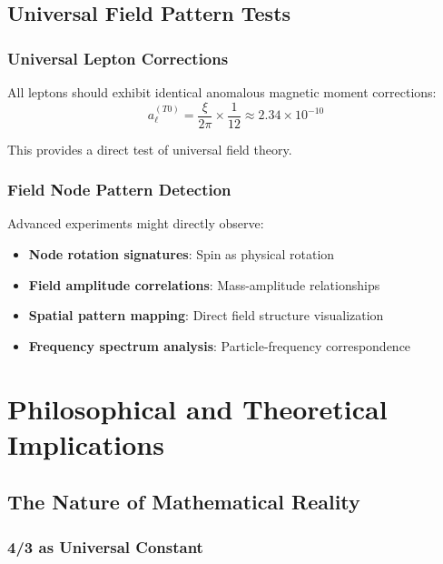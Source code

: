 	\subsection{Universal Field Pattern Tests}
	\label{subsec:field_pattern_tests}
	
	\subsubsection{Universal Lepton Corrections}
	\label{subsubsec:universal_lepton_corrections}
	
	All leptons should exhibit identical anomalous magnetic moment corrections:
	\begin{equation}
		a_{\ell}^{(T0)} = \frac{\xi}{2\pi} \times \frac{1}{12} \approx 2.34 \times 10^{-10}
		\label{eq:universal_lepton_prediction}
	\end{equation}
	
	This provides a direct test of universal field theory.
	
	\subsubsection{Field Node Pattern Detection}
	\label{subsubsec:node_pattern_detection}
	
	Advanced experiments might directly observe:
	\begin{itemize}
		\item \textbf{Node rotation signatures}: Spin as physical rotation
		\item \textbf{Field amplitude correlations}: Mass-amplitude relationships
		\item \textbf{Spatial pattern mapping}: Direct field structure visualization
		\item \textbf{Frequency spectrum analysis}: Particle-frequency correspondence
	\end{itemize}
	
	\section{Philosophical and Theoretical Implications}
	\label{sec:philosophical_implications}
	
	\subsection{The Nature of Mathematical Reality}
	\label{subsec:mathematical_reality}
	
	\subsubsection{4/3 as Universal Constant}
	\label{subsubsec:four_thirds_universal}
	

